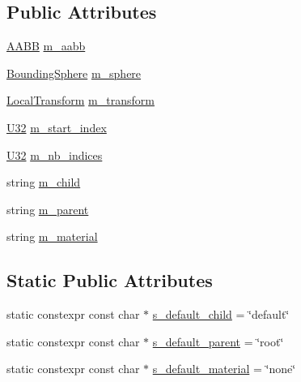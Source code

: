 \subsection*{Public Attributes}
\begin{DoxyCompactItemize}
\item 
\hyperlink{classmage_1_1_a_a_b_b}{A\+A\+BB} \hyperlink{structmage_1_1rendering_1_1_model_part_a69f7f90a31e48a286fecebc9e680b5ef}{m\+\_\+aabb}
\item 
\hyperlink{classmage_1_1_bounding_sphere}{Bounding\+Sphere} \hyperlink{structmage_1_1rendering_1_1_model_part_aa2204e02fe90f993990cdda677bff6e7}{m\+\_\+sphere}
\item 
\hyperlink{classmage_1_1_local_transform}{Local\+Transform} \hyperlink{structmage_1_1rendering_1_1_model_part_af34853cb09b179bd8ffb0da151914066}{m\+\_\+transform}
\item 
\hyperlink{namespacemage_a41c104c036fba3756a74e19f793eeaa1}{U32} \hyperlink{structmage_1_1rendering_1_1_model_part_a251d19417a0b4abe98faeae767b9fef4}{m\+\_\+start\+\_\+index}
\item 
\hyperlink{namespacemage_a41c104c036fba3756a74e19f793eeaa1}{U32} \hyperlink{structmage_1_1rendering_1_1_model_part_a6e622f4bcb1ada388c3ee489c22e4547}{m\+\_\+nb\+\_\+indices}
\item 
string \hyperlink{structmage_1_1rendering_1_1_model_part_ad2eb9ff5aaeecf676b54a1e2d7231ee8}{m\+\_\+child}
\item 
string \hyperlink{structmage_1_1rendering_1_1_model_part_a906ce278d6911d1163c8ce3a521c6598}{m\+\_\+parent}
\item 
string \hyperlink{structmage_1_1rendering_1_1_model_part_a1b2b0bf7c9acc87fc1673aac67a1849b}{m\+\_\+material}
\end{DoxyCompactItemize}
\subsection*{Static Public Attributes}
\begin{DoxyCompactItemize}
\item 
static constexpr const char $\ast$ \hyperlink{structmage_1_1rendering_1_1_model_part_ac3e89be808deeddd01e1c7445e23044d}{s\+\_\+default\+\_\+child} = \char`\"{}default\char`\"{}
\item 
static constexpr const char $\ast$ \hyperlink{structmage_1_1rendering_1_1_model_part_a030fd86febd5de7d3433a4f54e06c6a8}{s\+\_\+default\+\_\+parent} = \char`\"{}root\char`\"{}
\item 
static constexpr const char $\ast$ \hyperlink{structmage_1_1rendering_1_1_model_part_a4fd4471a31cdf49d5f07448207916d6c}{s\+\_\+default\+\_\+material} = \char`\"{}none\char`\"{}
\end{DoxyCompactItemize}


